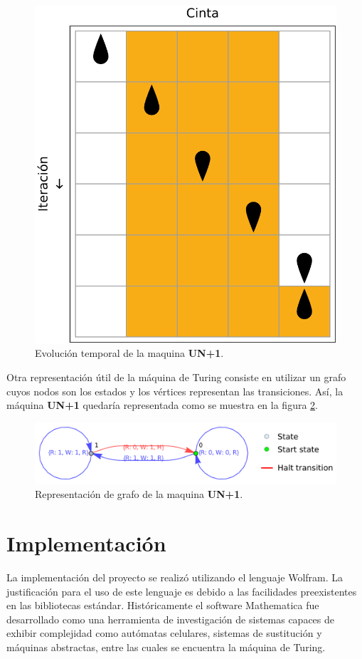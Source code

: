 \documentclass[10pt,a4paper]{article}
\begin{document}
\begin{figure}[h!tb!]
	\centering
	\includegraphics[scale=0.40]{../img/example_evolution.pdf}
	\caption{Evolución temporal de la maquina \textbf{UN+1}.}
	\label{fig:un1evolution}
\end{figure}

Otra representación útil de la máquina de Turing consiste en utilizar un grafo cuyos nodos son los estados y los vértices representan las transiciones. Así, la máquina \textbf{UN+1} quedaría representada como se muestra en la figura \ref{fig:un1graph}.
\begin{figure}[h!tb!]
	\centering
	\includegraphics[scale=0.48]{../img/un1_graph.pdf}
	\caption{Representación de grafo de la maquina \textbf{UN+1}.}
	\label{fig:un1graph}
\end{figure}

\section{Implementación}
La implementación del proyecto se realizó utilizando el lenguaje Wolfram. La justificación para el uso de este lenguaje es debido a las facilidades preexistentes en las bibliotecas estándar. Históricamente el software Mathematica fue desarrollado como una herramienta de investigación de sistemas capaces de exhibir complejidad como autómatas celulares, sistemas de sustitución y máquinas abstractas, entre las cuales se encuentra la máquina de Turing.
\end{document}
